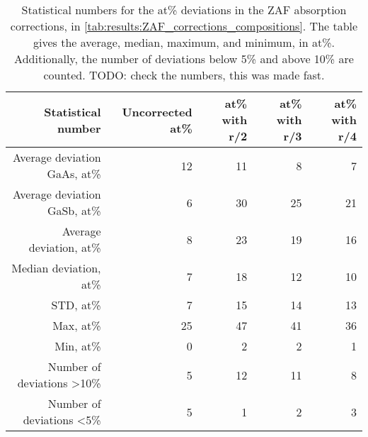 \begin{table}[phtb]
    \begin{center}
        \caption{
            Statistical numbers for the at\% deviations in the ZAF absorption corrections, in \cref{tab:results:ZAF_corrections_compositions}.
            The table gives the average, median, maximum, and minimum, in at\%. Additionally, the number of deviations below 5\% and above 10\% are counted.
            TODO: check the numbers, this was made fast.
        }
        \label{tab:results:ZAF_corrections_compositions_stats}
        \begin{tabular}{rrrrr}
            \hline
            \textbf{Statistical number}  & \textbf{Uncorrected at\%} & \textbf{at\% with r/2} & \textbf{at\% with r/3} & \textbf{at\% with r/4} \\
            \hline
            Average deviation GaAs, at\% & 12                        & 11                     & 8                      & 7                      \\
            Average deviation GaSb, at\% & 6                         & 30                     & 25                     & 21                     \\
            Average deviation, at\%      & 8                         & 23                     & 19                     & 16                     \\
            Median deviation, at\%       & 7                         & 18                     & 12                     & 10                     \\
            STD, at\%                    & 7                         & 15                     & 14                     & 13                     \\
            Max, at\%                    & 25                        & 47                     & 41                     & 36                     \\
            Min, at\%                    & 0                         & 2                      & 2                      & 1                      \\
            Number of deviations >10\%   & 5                         & 12                     & 11                     & 8                      \\
            Number of deviations  <5\%   & 5                         & 1                      & 2                      & 3                      \\
            \hline
        \end{tabular}
    \end{center}
\end{table}

